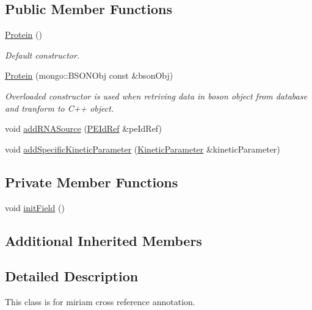 \subsection*{Public Member Functions}
\begin{DoxyCompactItemize}
\item 
\hyperlink{classunisys_1_1Protein_a199a9caa6e8cd9e4edb7a34877486223}{Protein} ()
\begin{DoxyCompactList}\small\item\em Default constructor. \end{DoxyCompactList}\item 
\hyperlink{classunisys_1_1Protein_a1e615787f262d7c322322ce1c75db2bc}{Protein} (mongo\-::\-B\-S\-O\-N\-Obj const \&bson\-Obj)
\begin{DoxyCompactList}\small\item\em Overloaded constructor is used when retriving data in boson object from database and tranform to C++ object. \end{DoxyCompactList}\item 
void \hyperlink{classunisys_1_1Protein_a4053ee01ab5382638f65c7aa72e7231f}{add\-R\-N\-A\-Source} (\hyperlink{classunisys_1_1PEIdRef}{P\-E\-Id\-Ref} \&pe\-Id\-Ref)
\item 
void \hyperlink{classunisys_1_1Protein_abf1e9a955dfd1d02850edb76dbee7857}{add\-Specific\-Kinetic\-Parameter} (\hyperlink{classunisys_1_1KineticParameter}{Kinetic\-Parameter} \&kinetic\-Parameter)
\end{DoxyCompactItemize}
\subsection*{Private Member Functions}
\begin{DoxyCompactItemize}
\item 
void \hyperlink{classunisys_1_1Protein_a41d52894afce9bd0f7f047ac560f38cf}{init\-Field} ()
\end{DoxyCompactItemize}
\subsection*{Additional Inherited Members}


\subsection{Detailed Description}
This class is for miriam cross reference annotation. 

